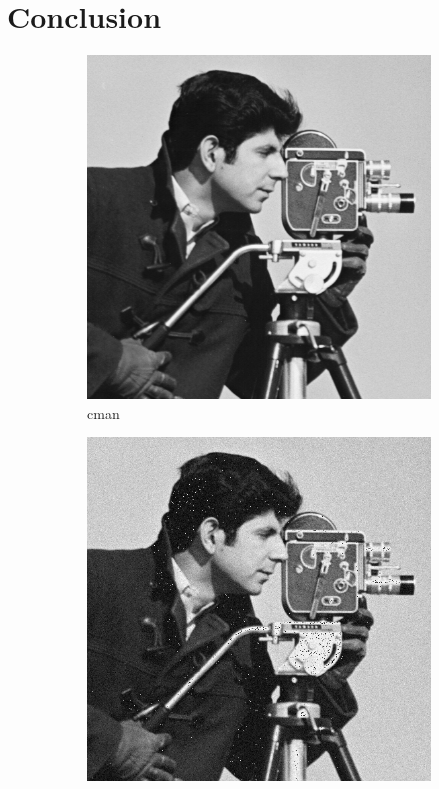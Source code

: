 \documentclass{article}
\begin{document}
\section{Conclusion}


\begin{figure}[h!]
	\centering
	\begin{subfigure}[b]{0.45\linewidth}
		\includegraphics[width=\linewidth]{../../2_Software/data/cman_512_512.png}
		\caption{cman}
	\end{subfigure}
	\begin{subfigure}[b]{0.45\linewidth}
		\includegraphics[width=\linewidth]{../../2_Software/data/cman_gnoise.png}

\end{subfigure}
\end{figure}
\end{document}

